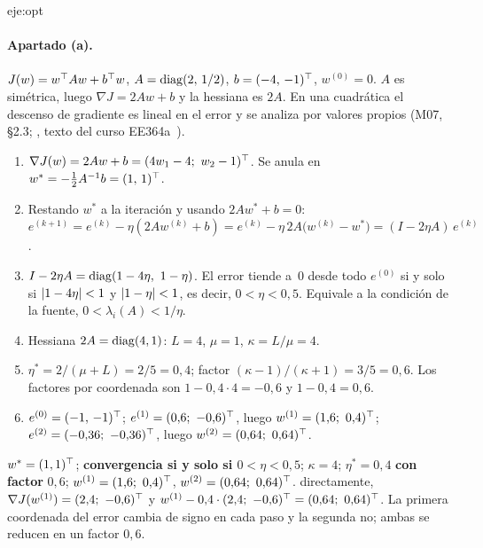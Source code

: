 \begin{solucion}{eje:opt}
\paragraph{Apartado (a).}
\datos $J(w)=w^{\top} Aw+b^{\top} w$, $A=\operatorname{diag}(2,\,1/2)$, $b=(-4,\,-1)^{\top}$, $w^{(0)}=0$.
\planteamiento $A$ es simétrica, luego $\nabla J=2Aw+b$ y la hessiana es $2A$. En una cuadrática el descenso de gradiente es lineal en el error y se analiza por valores propios (M07, §2.3; \cite[§9.3]{bv}, texto del curso EE364a~\cite{ee364a}).
\pasos
\begin{enumerate}[label=\arabic*.]
  \item $\nabla J(w)=2Aw+b=(4w_1-4;\allowbreak\ w_2-1)\T$. Se anula en $w^{*}=-\tfrac12A^{-1}b=(1,\,1)^{\top}$.
  \item Restando $w^{*}$ a la iteración y usando $2Aw^{*}+b=0$: $e^{(k+1)}=e^{(k)}-\eta(2Aw^{(k)}+b)=e^{(k)}-\eta\,2A\bigl(w^{(k)}-w^{*}\bigr)=(I-2\eta A)\,e^{(k)}$.
  \item $I-2\eta A=\diag(1-4\eta,\ 1-\eta)$. El error tiende a~0 desde todo $e^{(0)}$ si y solo si $\lvert1-4\eta\rvert<1$ y $\lvert1-\eta\rvert<1$, es decir, $0<\eta<0{,}5$. Equivale a la condición de la fuente, $0<\lambda_i(A)<1/\eta$.
  \item Hessiana $2A=\operatorname{diag}(4,1)$: $L=4$, $\mu=1$, $\kappa=L/\mu=4$.
  \item $\eta^{*}=2/(\mu+L)=2/5=0{,}4$; factor $(\kappa-1)/(\kappa+1)=3/5=0{,}6$. Los factores por coordenada son $1-0{,}4\cdot 4=-0{,}6$ y $1-0{,}4=0{,}6$.
  \item $e^{(0)}=(-1,\,-1)^{\top}$; $e^{(1)}=(0{,}6;\allowbreak\ -0{,}6)^{\top}$, luego $w^{(1)}=(1{,}6;\allowbreak\ 0{,}4)\T$; $e^{(2)}=(-0{,}36;\allowbreak\ -0{,}36)^{\top}$, luego $w^{(2)}=(0{,}64;\allowbreak\ 0{,}64)\T$.
\end{enumerate}
\resultado $w^{*}=(1,1)^{\top}$; \textbf{convergencia si y solo si $0<\eta<0{,}5$}; $\kappa=4$; $\eta^{*}=0{,}4$ \textbf{con factor} $0{,}6$; $w^{(1)}=(1{,}6;\allowbreak\ 0{,}4)\T$, $w^{(2)}=(0{,}64;\allowbreak\ 0{,}64)\T$.
\comprobacion directamente, $\nabla J(w^{(1)})=(2{,}4;\allowbreak\ -0{,}6)^{\top}$ y $w^{(1)}-0{,}4\cdot(2{,}4;\allowbreak\ -0{,}6)\T=(0{,}64;\allowbreak\ 0{,}64)\T$. La primera coordenada del error cambia de signo en cada paso y la segunda no; ambas se reducen en un factor $0{,}6$.


\end{solucion}
